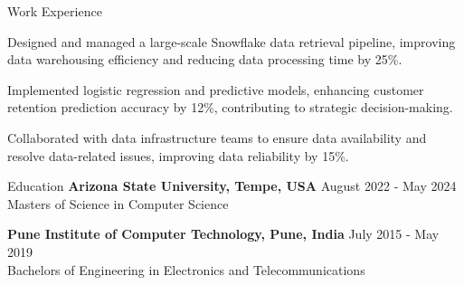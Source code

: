 \documentclass{resume} %
\begin{document}
\begin{rSection}{Work Experience}
\begin{rSubsection}
                                    {}
                                {}
                                    \item Designed and managed a large{-}scale Snowflake data retrieval pipeline, improving data warehousing efficiency and reducing data processing time by 25\%.
                                    \item Implemented logistic regression and predictive models, enhancing customer retention prediction accuracy by 12\%, contributing to strategic decision{-}making.
                                    \item Collaborated with data infrastructure teams to ensure data availability and resolve data{-}related issues, improving data reliability by 15\%.
                            \end{rSubsection}
            \end{rSection}

\begin{rSection}{Education}
                        \textbf{Arizona State University, Tempe, USA} \hfill {August 2022 - May 2024} \\
                            {Masters of Science in Computer Science}
                         
             
         
                        \textbf{Pune Institute of Computer Technology, Pune, India} \hfill {July 2015 - May 2019} \\
                            {Bachelors of Engineering in Electronics and Telecommunications}
                         
             
         
    \end{rSection}
\end{document}
